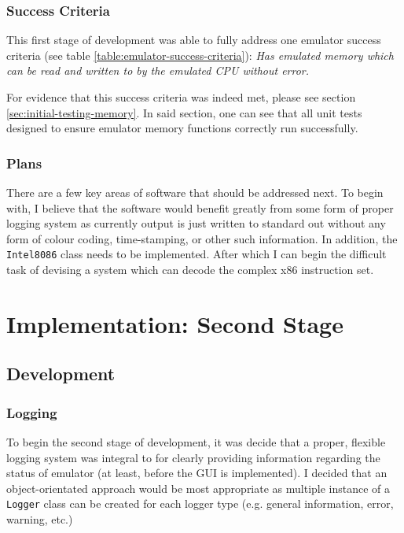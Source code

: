     \subsubsection{Success Criteria}
        This first stage of development was able to fully address one emulator success criteria (see table \ref{table:emulator-success-criteria}): \textit{Has emulated memory which can be read and written to by the emulated CPU without error.}

        For evidence that this success criteria was indeed met, please see section \ref{sec:initial-testing-memory}. In said section, one can see that all unit tests designed to ensure emulator memory functions correctly run successfully.

    \subsubsection{Plans}
        There are a few key areas of software that should be addressed next. To begin with, I believe that the software would benefit greatly from some form of proper logging system as currently output is just written to standard out without any form of colour coding, time-stamping, or other such information. In addition, the \texttt{Intel8086} class needs to be implemented. After which I can begin the difficult task of devising a system which can decode the complex x86 instruction set.



\newpage
\section{Implementation: Second Stage} %

\subsection{Development}
    \subsubsection{Logging}
        To begin the second stage of development, it was decide that a proper, flexible logging system was integral to for clearly providing information regarding the status of emulator (at least, before the GUI is implemented). I decided that an object-orientated approach would be most appropriate as multiple instance of a \texttt{Logger} class can be created for each logger type (e.g. general information, error, warning, etc.)

